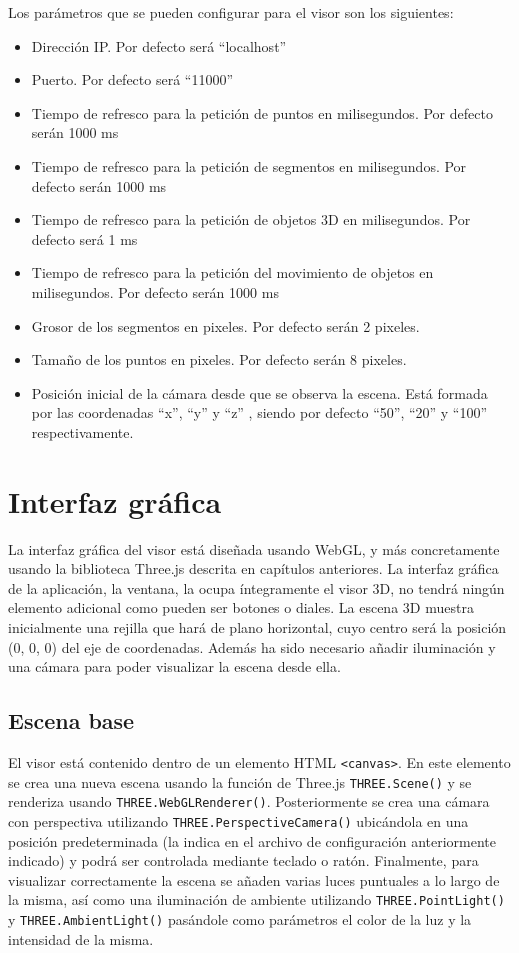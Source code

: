 Los parámetros que se pueden configurar para el visor son los siguientes:
\begin{itemize}
\item Dirección IP. Por defecto será ``localhost''
\item Puerto. Por defecto será ``11000''
\item Tiempo de refresco para la petición de puntos en milisegundos. Por defecto serán 1000 ms
\item Tiempo de refresco para la petición de segmentos en milisegundos. Por defecto serán 1000 ms
\item Tiempo de refresco para la petición de objetos 3D en milisegundos. Por defecto será 1 ms
\item Tiempo de refresco para la petición del movimiento de objetos en milisegundos. Por defecto serán 1000 ms
\item Grosor de los segmentos en pixeles. Por defecto serán 2 pixeles.
\item Tamaño de los puntos en pixeles. Por defecto serán 8 pixeles.
\item Posición inicial de la cámara desde que se observa la escena. Está formada por las coordenadas ``x'', ``y'' y ``z'' , siendo por defecto ``50'', ``20'' y ``100'' respectivamente.
\end{itemize}

\section{Interfaz gráfica}
La interfaz gráfica del visor está diseñada usando WebGL, y más concretamente usando la biblioteca Three.js descrita en capítulos anteriores. La interfaz gráfica de la aplicación, la ventana, la ocupa íntegramente el visor 3D, no tendrá ningún elemento adicional como pueden ser botones o diales. La escena 3D muestra inicialmente una rejilla que hará de plano horizontal, cuyo centro será la posición (0, 0, 0) del eje de coordenadas. Además ha sido necesario añadir iluminación y una cámara para poder visualizar la escena desde ella.

\subsection{Escena base}
El visor está contenido dentro de un elemento HTML \texttt{<canvas>}. En este elemento se crea una nueva escena usando la función de Three.js \texttt{THREE.Scene()} y se renderiza usando \texttt{THREE.WebGLRenderer()}. Posteriormente se crea una cámara con perspectiva utilizando \texttt{THREE.PerspectiveCamera()} ubicándola en una posición predeterminada (la indica en el archivo de configuración anteriormente indicado) y podrá ser controlada mediante teclado o ratón. Finalmente, para visualizar correctamente la escena se añaden varias luces puntuales a lo largo de la misma, así como una iluminación de ambiente utilizando \texttt{THREE.PointLight()} y \texttt{THREE.AmbientLight()} pasándole como parámetros el color de la luz y la intensidad de la misma.

